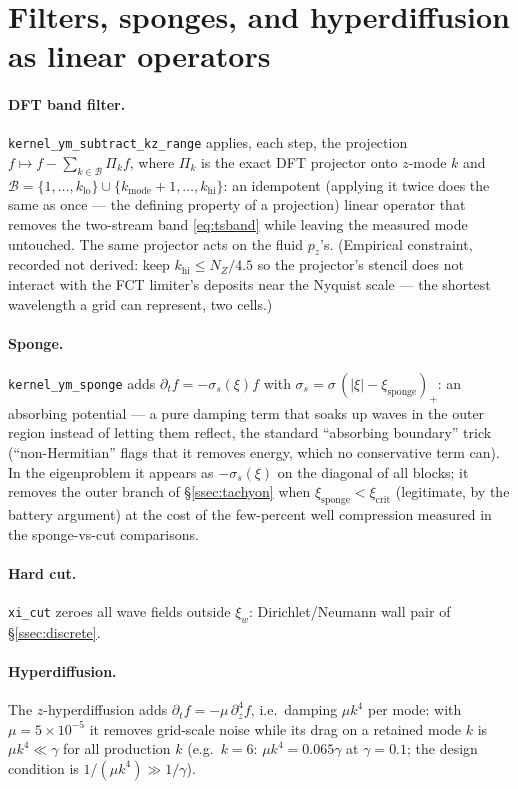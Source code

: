 \documentclass[11pt,a4paper]{article}
\numberwithin{equation}{section}
\theoremstyle{remark}
\begin{document}
\section{Filters, sponges, and hyperdiffusion as linear operators}
\label{app:filters}

\paragraph{DFT band filter.} \texttt{kernel\_ym\_subtract\_kz\_range}
applies, each step, the projection
$f\mapsto f-\sum_{k\in\mathcal B}\Pi_kf$, where $\Pi_k$ is the exact DFT
projector onto $z$-mode $k$ and $\mathcal B=\{1,\dots,k_{\mathrm{lo}}\}
\cup\{k_{\mathrm{mode}}+1,\dots,k_{\mathrm{hi}}\}$: an idempotent
(applying it twice does the same as once --- the defining property of a
projection) linear
operator that removes the two-stream band \eqref{eq:tsband} while leaving
the measured mode untouched. The same projector acts on the fluid
$p_z$'s. (Empirical constraint, recorded not derived: keep
$k_{\mathrm{hi}}\le N_Z/4.5$ so the projector's stencil does not interact
with the FCT limiter's deposits near the Nyquist scale --- the
shortest wavelength a grid can represent, two cells.)

\paragraph{Sponge.} \texttt{kernel\_ym\_sponge} adds
$\partial_tf=-\sigma_s(\xi)f$ with
$\sigma_s=\sigma\,(|\xi|-\xi_{\mathrm{sponge}})_+$: an absorbing
potential --- a pure damping term that soaks up waves in the outer
region instead of letting them reflect, the standard ``absorbing
boundary'' trick (``non-Hermitian'' flags that it removes energy, which
no conservative term can). In the eigenproblem it appears as
$-\sigma_s(\xi)$ on the diagonal of all blocks; it removes the outer
branch of \S\ref{ssec:tachyon} when $\xi_{\mathrm{sponge}}
<\xi_{\mathrm{crit}}$ (legitimate, by the battery argument) at the cost
of the few-percent well compression measured in the sponge-vs-cut
comparisons.

\paragraph{Hard cut.} \texttt{xi\_cut} zeroes all wave fields outside
$\xi_w$: Dirichlet/Neumann wall pair of \S\ref{ssec:discrete}.

\paragraph{Hyperdiffusion.} The $z$-hyperdiffusion adds
$\partial_tf=-\mu\,\partial_z^4f$, i.e.\ damping $\mu k^4$ per mode: with
$\mu=5\times10^{-5}$ it removes grid-scale noise while its drag on a
retained mode $k$ is $\mu k^4\ll\gamma$ for all production $k$ (e.g.\
$k=6$: $\mu k^4=0.065\gamma$ at $\gamma=0.1$; the design condition is
$1/(\mu k^4)\gg1/\gamma$).
\end{document}
